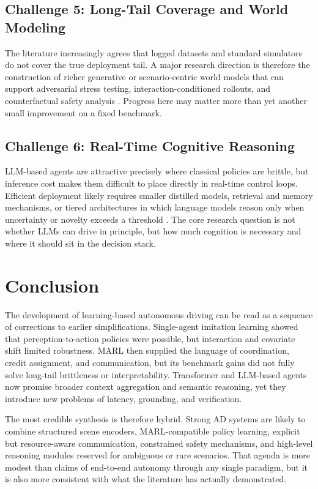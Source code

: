 \documentclass[12pt, a4paper]{article}
\begin{document}
\subsection{Challenge 5: Long-Tail Coverage and World Modeling}

The literature increasingly agrees that logged datasets and standard simulators do
not cover the true deployment tail. A major research direction is therefore the
construction of richer generative or scenario-centric world models that can
support adversarial stress testing, interaction-conditioned rollouts, and
counterfactual safety analysis \cite{tobin2017domain,finn2017model,caesar2021nuplan,fu2023drive}. Progress here may matter more than yet another small improvement on a fixed benchmark.

\subsection{Challenge 6: Real-Time Cognitive Reasoning}

LLM-based agents are attractive precisely where classical policies are brittle,
but inference cost makes them difficult to place directly in real-time control
loops. Efficient deployment likely requires smaller distilled models, retrieval
and memory mechanisms, or tiered architectures in which language models reason
only when uncertainty or novelty exceeds a threshold
\cite{wen2023dilu,mao2023gpt,sha2023languagempc}. The core research question is
not whether LLMs can drive in principle, but how much cognition is necessary and
where it should sit in the decision stack.

\section{Conclusion}
\label{sec:conclusion}

The development of learning-based autonomous driving can be read as a sequence of
corrections to earlier simplifications. Single-agent imitation learning showed
that perception-to-action policies were possible, but interaction and covariate
shift limited robustness. MARL then supplied the language of coordination,
credit assignment, and communication, but its benchmark gains did not fully solve
long-tail brittleness or interpretability. Transformer and LLM-based agents now
promise broader context aggregation and semantic reasoning, yet they introduce
new problems of latency, grounding, and verification.

The most credible synthesis is therefore hybrid. Strong AD systems are likely to
combine structured scene encoders, MARL-compatible policy learning, explicit but
resource-aware communication, constrained safety mechanisms, and high-level
reasoning modules reserved for ambiguous or rare scenarios. That agenda is more
modest than claims of end-to-end autonomy through any single paradigm, but it is
also more consistent with what the literature has actually demonstrated.



\end{document}
